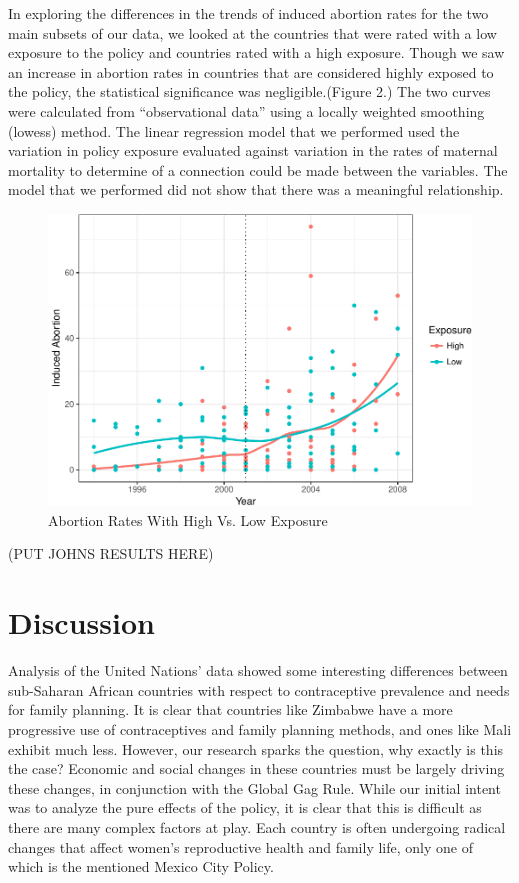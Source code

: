 \documentclass[11pt,]{article}
\makeatletter
\def\maxwidth{\ifdim\Gin@nat@width>\linewidth\linewidth
\else\Gin@nat@width\fi}
\let\Oldincludegraphics\includegraphics
\renewcommand{\includegraphics}[1]{\Oldincludegraphics[width=\maxwidth]{#1}}
\makeatother
\begin{document}
In exploring the differences in the trends of induced abortion rates for
the two main subsets of our data, we looked at the countries that were
rated with a low exposure to the policy and countries rated with a high
exposure. Though we saw an increase in abortion rates in countries that
are considered highly exposed to the policy, the statistical
significance was negligible.(Figure 2.) The two curves were calculated
from ``observational data'' using a locally weighted smoothing (lowess)
method. The linear regression model that we performed used the variation
in policy exposure evaluated against variation in the rates of maternal
mortality to determine of a connection could be made between the
variables. The model that we performed did not show that there was a
meaningful relationship.

\begin{figure}
\centering
\includegraphics{final-paper_files/figure-latex/unnamed-chunk-2-1.pdf}
\caption{Abortion Rates With High Vs. Low Exposure}
\end{figure}

(PUT JOHNS RESULTS HERE)

\section{Discussion}\label{discussion}

Analysis of the United Nations' data showed some interesting differences
between sub-Saharan African countries with respect to contraceptive
prevalence and needs for family planning. It is clear that countries
like Zimbabwe have a more progressive use of contraceptives and family
planning methods, and ones like Mali exhibit much less. However, our
research sparks the question, why exactly is this the case? Economic and
social changes in these countries must be largely driving these changes,
in conjunction with the Global Gag Rule. While our initial intent was to
analyze the pure effects of the policy, it is clear that this is
difficult as there are many complex factors at play. Each country is
often undergoing radical changes that affect women's reproductive health
and family life, only one of which is the mentioned Mexico City Policy.
\end{document}
